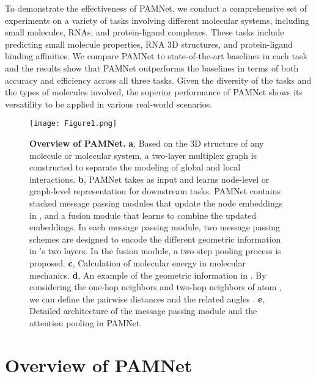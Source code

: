 \documentclass[fleqn,10pt]{wlscirep}
\newcommand{\method}{PAMNet\xspace}
\begin{document}
To demonstrate the effectiveness of \method, we conduct a comprehensive set of experiments on a variety of tasks involving different molecular systems, including small molecules, RNAs, and protein-ligand complexes. These tasks include predicting small molecule properties, RNA 3D structures, and protein-ligand binding affinities. We compare \method to state-of-the-art baselines in each task and the results show that \method outperforms the baselines in terms of both accuracy and efficiency across all three tasks. Given the diversity of the tasks and the types of molecules involved, the superior performance of \method shows its versatility to be applied in various real-world scenarios.


\begin{figure}[t]
    \centering
    \texttt{[image: Figure1.png]}
    \caption{\label{fig:method}\textbf{Overview of \method.} \textbf{a}, Based on the 3D structure of any molecule or molecular system, a two-layer multiplex graph  is constructed to separate the modeling of global and local interactions. \textbf{b}, \method takes  as input and learns node-level or graph-level representation for downstream tasks. \method contains stacked message passing modules that update the node embeddings  in , and a fusion module that learns to combine the updated embeddings. In each message passing module, two message passing schemes are designed to encode the different geometric information in 's two layers. In the fusion module, a two-step pooling process is proposed. \textbf{c}, Calculation of molecular energy  in molecular mechanics. \textbf{d}, An example of the geometric information in . By considering the one-hop neighbors  and two-hop neighbors  of atom , we can define the pairwise distances  and the related angles . \textbf{e}, Detailed architecture of the message passing module and the attention pooling in \method.}
\end{figure}


\section*{Overview of \method}
\end{document}
